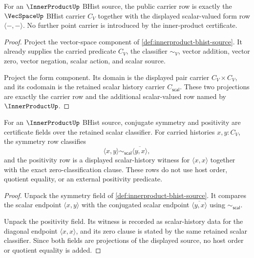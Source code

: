 \begin{theorem}
\label{thm:innerproduct-bhist-carrier-row}
For an $\InnerProductUp$ BHist source, the public carrier row is exactly the
$\VecSpaceUp$ BHist carrier $C_V$ together with the displayed scalar-valued
form row $\langle-,-\rangle$. No further point carrier is introduced by the
inner-product certificate.
\end{theorem}
\begin{proof}
Project the vector-space component of
\autoref{def:innerproduct-bhist-source}. It already supplies the carried
predicate $C_V$, the classifier $\sim_V$, vector addition, vector zero,
vector negation, scalar action, and scalar source.

Project the form component. Its domain is the displayed pair carrier
$C_V\times C_V$, and its codomain is the retained scalar history carrier
$C_{\mathsf{scal}}$. These two projections are exactly the carrier row and
the additional scalar-valued row named by $\InnerProductUp$.
\end{proof}

\begin{theorem}
\label{thm:innerproduct-symmetry-positivity-row}
For an $\InnerProductUp$ BHist source, conjugate symmetry and positivity are
certificate fields over the retained scalar classifier. For carried histories
$x,y:C_V$, the symmetry row classifies
$$
\langle x,y\rangle
\sim_{\mathsf{scal}}
\overline{\langle y,x\rangle},
$$
and the positivity row is a displayed scalar-history witness for
$\langle x,x\rangle$ together with the exact zero-classification clause. These
rows do not use host order, quotient equality, or an external positivity
predicate.
\end{theorem}
\begin{proof}
Unpack the symmetry field of
\autoref{def:innerproduct-bhist-source}. It compares the scalar endpoint
$\langle x,y\rangle$ with the conjugated scalar endpoint
$\overline{\langle y,x\rangle}$ using $\sim_{\mathsf{scal}}$.

Unpack the positivity field. Its witness is recorded as scalar-history data
for the diagonal endpoint $\langle x,x\rangle$, and its zero clause is stated
by the same retained scalar classifier. Since both fields are projections of
the displayed source, no host order or quotient equality is added.
\end{proof}

